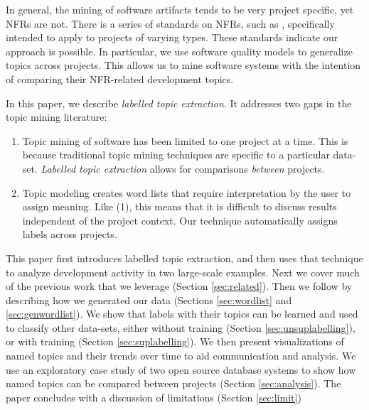\documentclass[]{sig-alternate}
\begin{document}
In general, the mining of software artifacts tends to be very project specific, yet NFRs are not. 
There is a series of standards on NFRs, such as \cite{iso9126}, specifically intended to apply to projects of varying types.
These standards indicate our approach is possible. %
In particular, we use software quality models to generalize topics across projects. 
This allows us to mine software systems with the intention of comparing their NFR-related development topics.



In this paper, we describe \emph{labelled topic extraction}. It addresses two gaps in the topic mining literature:
\begin{enumerate}
  \item Topic mining of software has been limited to one project at a time. 
This is because traditional topic mining techniques are specific to a particular data-set. 
\textit{Labelled topic extraction} allows for comparisons \textit{between} projects. 
  \item Topic modeling creates word lists that require interpretation by the user to assign meaning. 
Like (1), this means
that it is difficult to discuss results independent of the project context. 
Our technique automatically assigns labels across projects.
\end{enumerate}

This paper first introduces labelled topic extraction, and then uses that technique to analyze development activity in two large-scale examples.
Next we cover much of the previous work that we leverage (Section \ref{sec:related}).
Then we follow by describing how we generated our data (Sections  \ref{sec:wordlist} and \ref{sec:genwordlist}). 
We show that labels with their topics can be learned and used to classify other data-sets, either without training (Section \ref{sec:unsuplabelling}), or with training (Section \ref{sec:suplabelling}). 
We then present visualizations of named topics and their trends over time to aid communication and analysis. 
We use an exploratory case study of two open source database systems to show how named topics can be compared between projects  (Section \ref{sec:analysis}). 
The paper concludes with a discussion of limitations (Section \ref{sec:limit}) 
\end{document}
